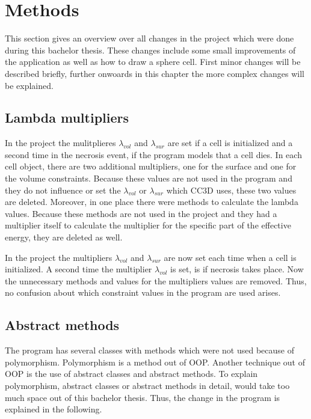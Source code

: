 \chapter{Methods}
    
This section gives an overview over all changes in the project which were done during this bachelor thesis. These changes include some small improvements of the application as well as how to draw a sphere cell. First minor changes will be described briefly, further onwoards in this chapter the more complex changes will be explained. 

\section{Lambda multipliers} \label{sec:LambdaMultipliers}
In the project the mulitplieres $\lambda_{vol}$ and $\lambda_{sur}$ are set if a cell is initialized and a second time in the necrosis event, if the program models that a cell dies. \newline
In each cell object, there are two additional multipliers, one for the surface and one for the volume constraints. Because these values are not used in the program and they do not influence or set the $\lambda_{vol}$ or $\lambda_{sur}$ which \ac{CC3D} uses, these two values are deleted. Moreover, in one place there were methods to calculate the lambda values. Because these methods are not used in the project and they had a multiplier itself to calculate the multiplier for the specific part of the effective energy, they are deleted as well. 

In the project the multipliers $\lambda_{vol}$ and $\lambda_{sur}$ are now set each time when a cell is initialized. A second time the multiplier $\lambda_{vol}$ is set, is if necrosis takes place. Now the unnecessary methods and values for the multipliers values are removed. Thus, no confusion about which constraint values in the program are used arises.

\section{Abstract methods}\label{sec:AbstractMethods}
The program has several classes with methods which were not used because of polymorphism. Polymorphism is a method out of \ac{OOP}. Another technique out of \ac{OOP} is the use of abstract classes and abstract methods. To explain polymorphism, abstract classes or abstract methods in detail, would take too much space out of this bachelor thesis. Thus, the change in the program is explained in the following.

